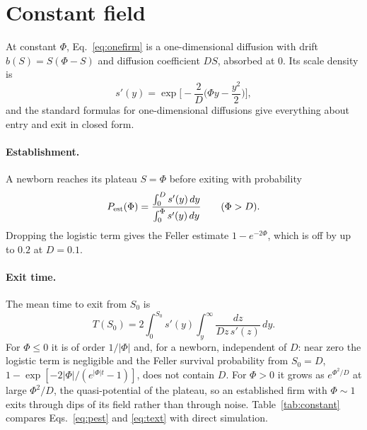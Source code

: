 \documentclass[pre,twocolumn,superscriptaddress,nofootinbib]{revtex4-2}
\begin{document}
\section{Constant field}
\label{sec:constant}

At constant $\Phi$, Eq.~\eqref{eq:onefirm} is a one-dimensional diffusion with drift $b(S)=S(\Phi-S)$
and diffusion coefficient $DS$, absorbed at $0$.  Its scale density is
\begin{equation}
s'(y)=\exp\Big[-\frac2D\Big(\Phi y-\frac{y^2}{2}\Big)\Big],
\end{equation}
and the standard formulas for one-dimensional diffusions \cite{karlintaylor1981} give everything
about entry and exit in closed form.

\paragraph{Establishment.}  A newborn reaches its plateau $S=\Phi$ before exiting with probability
\begin{equation}
P_{\rm est}(\Phi)=\frac{\int_0^Ds'(y)\,dy}{\int_0^\Phi s'(y)\,dy}\qquad(\Phi>D).
\label{eq:pest}
\end{equation}
Dropping the logistic term gives the Feller estimate $1-e^{-2\Phi}$, which is off by up to
$0.2$ at $D=0.1$.

\paragraph{Exit time.}  The mean time to exit from $S_0$ is
\begin{equation}
T(S_0)=2\int_0^{S_0}s'(y)\int_y^\infty\frac{dz}{Dz\,s'(z)}\,dy .
\label{eq:text}
\end{equation}
For $\Phi\le0$ it is of order $1/|\Phi|$ and, for a newborn, independent of $D$: near zero the logistic term
is negligible and the Feller survival probability from $S_0=D$, $1-\exp[-2|\Phi|/(e^{|\Phi|t}-1)]$, does not
contain $D$.
For $\Phi>0$ it grows as $e^{\Phi^2/D}$ at large $\Phi^2/D$, the quasi-potential of the plateau, so an
established firm with $\Phi\sim1$ exits through dips of its field rather than through noise.
Table~\ref{tab:constant} compares Eqs.~\eqref{eq:pest} and \eqref{eq:text} with direct simulation.
\end{document}
